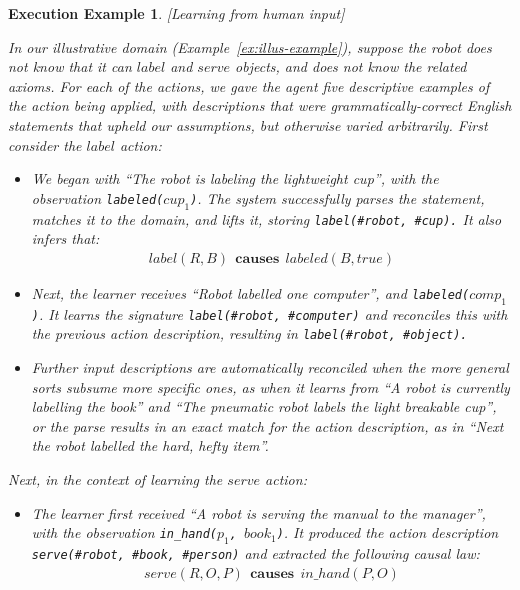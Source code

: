 \documentclass{article}
\newcommand{\stt}[1]{{\small\texttt{#1}}}
\newtheorem{execexample}{\bf Execution Example}
\begin{document}
\begin{execexample}\label{ex:ra-domain-exec}[Learning from human input]\\
  {\rm In our illustrative domain (Example~\ref{ex:illus-example}),
    suppose the robot does not know that it can $label$ and $serve$
    objects, and does not know the related axioms.  For each of the
    actions, we gave the agent five descriptive examples of the action
    being applied, with descriptions that were grammatically-correct
    English statements that upheld our assumptions, but otherwise
    varied arbitrarily. First consider the $label$ action:
    \begin{itemize}
    \item We began with ``The robot is labeling the lightweight cup'',
      with the observation \stt{labeled($cup_1$)}.  The system
      successfully parses the statement, matches it to the domain, and
      lifts it, storing \stt{label(\#robot, \#cup).} It also infers
      that:
      \begin{align*}
        label(R, B)~~\mathbf{causes}~~labeled(B, true)
      \end{align*}
      
    \item Next, the learner receives ``Robot labelled one computer'',
      and \stt{labeled($comp_1$)}. It learns the signature
      \stt{label(\#robot, \#computer)} and reconciles this with the
      previous action description, resulting in \stt{label(\#robot,
        \#object).}
    
    \item Further input descriptions are automatically reconciled when
      the more general sorts subsume more specific ones, as when it
      learns from ``A robot is currently labelling the book'' and
      ``The pneumatic robot labels the light breakable cup'', or the
      parse results in an exact match for the action description, as
      in ``Next the robot labelled the hard, hefty item''.
    \end{itemize}
    Next, in the context of learning the $serve$ action:
    \begin{itemize}
    \item The learner first received ``A robot is serving the manual
      to the manager'', with the observation \stt{in\_hand($p_1$,
        $book_1$)}.  It produced the action description
      \stt{serve(\#robot, \#book, \#person)} and extracted the
      following causal law:
      \begin{align*}
        serve(R, O, P)~~\mathbf{causes}~~in\_hand(P, O)
      \end{align*}


\end{itemize}}
\end{execexample}
\end{document}
